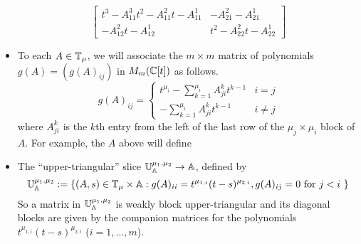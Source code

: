 \documentclass[draft]{article}
\begin{document}
\begin{itemize}
\[            \left[\begin{array}{rr}
                t^{3} - A_{11}^3 t^2 - A_{11}^2 t - A_{11}^1 & -A_{21}^2 - A_{21}^1  \\
                -A_{12}^2 t - A_{12}^1 & t^{2} - A_{22}^2 t - A_{22}^1
            \end{array}\right]
    \]
    
    \item To each $ A \in \mathbb T_\mu$, we will associate the $m\times m$ matrix 
    of polynomials 
    $ g(A) = \left( g(A)_{ij} \right)$ in $ M_m(\mathbb C[t]) $ as follows.
    \begin{equation}
        \label{eq:mvyofa}
        g(A)_{ij} = 
    \begin{cases} t^{\mu_i} - \sum_{k=1}^{\mu_i} A^k_{ji} t^{k-1} & i = j \\
            - \sum_{k=1}^{\mu_i} A^k_{ji} t^{k-1} & i \ne j
    \end{cases}
    \end{equation}
    where $A^k_{ji}$ is the $k$th entry from the left of the last row of the $\mu_j\times\mu_i$ block of $A$. 
    For example, the $A$ above will define 

    
    \item The ``upper-triangular'' \mvy slice $\mathbb U^{\mu_1, \mu_2}_\mathbb A \rightarrow \mathbb A $, defined by
    $$
    \mathbb U^{\mu_1, \mu_2}_\mathbb A := \{ (A,s) \in \mathbb T_\mu \times \mathbb A : g(A)_{ii} = t^{\mu_{1,i}} (t-s)^{\mu_{2,i}}, g(A)_{ij} = 0 \text{ for $ j < i $ }\}
    $$
    So a matrix in $\mathbb U^{\mu_1, \mu_2}_\mathbb A  $ is weakly block upper-triangular and its diagonal blocks are given by the companion matrices for the polynomials $t^{\mu_{1,i}} (t-s)^{\mu_{2,i}}$ ($i=1,\dots,m$).
    

\end{itemize}
\end{document}
